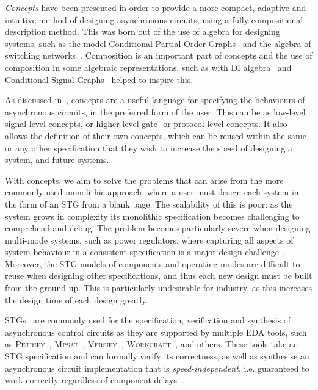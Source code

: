 \documentclass[british,conference,compsoc]{IEEEtran}
\newcommand{\noun}[1]{\textsc{#1}}
\begin{document}
\emph{Concepts} have been presented in order to provide a more compact, adaptive and intuitive method of
designing asynchronous circuits, using a fully compositional description method. 
This was born out of the use of algebra for designing systems,
such as the model Conditional Partial Order Graphs~\cite{CPOG1}\cite{CPOG2}\cite{2014_mokhov_pg} and
the algebra of switching networks~\cite{mokhov2015algebra}. Composition is an important part of concepts
 and the use of composition in some algebraic representations, such as with DI algebra~\cite{270632} 
 and Conditional Signal Graphs~\cite{6243877} helped to inspire this. 

As discussed in~\cite{2015_Beaumont_MEMOCODE}, concepts are a useful language for specifying
the behaviours of asynchronous circuits, in the preferred form of the user. This can be as low-level 
signal-level concepts, or higher-level gate- or protocol-level concepts. It also allows the definition of 
their own concepts, which can be reused within the same or any other specification that they wish
to increase the speed of designing a system, and future systems. 

With concepts, we aim to solve the problems that can arise from the more commonly used
monolithic approach, where a user must design each system in the form of an STG from a blank page. 
The scalability of this is poor: as the system grows in complexity its monolithic specification becomes 
challenging to comprehend and debug. The problem becomes particularly severe when designing 
multi-mode systems, such as power regulators, where capturing all aspects of system behaviour in a
consistent specification is a major design challenge~\cite{2014_sokolov_ftfc}\cite{sokolov2015design}. 
Moreover, the STG models of components and operating modes are difficult to reuse when designing 
other specifications, and thus each new design must be built from the ground up. This is particularly 
undesirable for industry, as this increases the design time of each design greatly. 

STGs~\cite{Chu_1987_phd}\cite{Rosenblum_1985_tpn}
are commonly used for the specification,
verification and synthesis of asynchronous control circuits as they are
supported by multiple EDA tools, such as \noun{Petrify}~\cite{Cortadella},
\noun{Mpsat}~\cite{khomenko2004detecting}, \noun{Versify}~\cite{i1997formal},
\noun{Workcraft}~\cite{2007_poliakov_workcraft}\cite{Workcraft_website}, and
others.
These tools take an STG specification and can
formally verify its correctness, as well as synthesise an asynchronous
circuit implementation that is \emph{speed-independent}, i.e. guaranteed
to work correctly regardless of component delays~\cite{Muller_1959_ts}.
\end{document}
